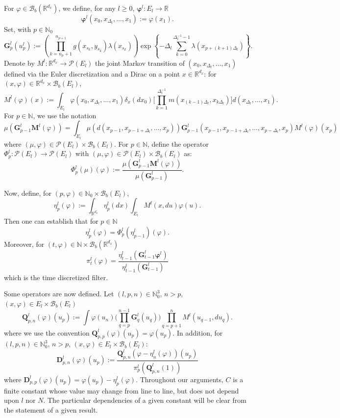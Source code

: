 \documentclass[english]{article}
\begin{document}
For $\varphi\in\mathcal{B}_b(\mathbb{R}^{d_x})$, we define, for any $l\geq 0$, $\pmb{\varphi}^l:E_l\rightarrow\mathbb{R}$
$$
\pmb{\varphi}^l(x_0,x_{\Delta_l},\dots,x_{1}) := \varphi(x_1).
$$
Set, with $p\in\mathbb{N}_0$
$$
\mathbf{G}_p^l(u_p^l) := \left(\prod_{k=n_{p}+1}^{n_{p+1} }g(x_{s_k},y_{s_k})\lambda(x_{s_k})\right)\exp\left\{-\Delta_l\sum_{k=0}^{\Delta_l^{-1}-1}\lambda(x_{p+(k+1)\Delta_l})\right\}.
$$
Denote by $M^l:\mathbb{R}^{d_x}\rightarrow\mathcal{P}(E_l)$ the joint Markov transition of $(x_0,x_{\Delta_l},\dots,x_{1})$ defined via the Euler discretization and a Dirac on a point $x\in\mathbb{R}^{d_x}$:  for $(x,\varphi)\in\mathbb{R}^{d_x}\times\mathcal{B}_b(E_l)$, 
$$
M^l(\varphi)(x) := \int_{E_l}\varphi(x_0,x_{\Delta_l},\dots,x_{1})\delta_x(dx_0)\Big[\prod_{k=1}^{\Delta_l^{-1}}m(x_{(k-1)\Delta_l},x_{k\Delta_l})\Big]d(x_{\Delta_l},\dots,x_{1}).
$$
For $p\in\mathbb{N}$, we use the notation 
$$
\mu(\mathbf{G}_{p-1}^l\mathbf{M}^l(\varphi))= \int_{E_l}\mu(d(x_{p-1},x_{p-1+\Delta_l},\dots,x_{p}))\mathbf{G}_{p-1}^l(x_{p-1},x_{p-1+\Delta_l},\dots,x_{p-\Delta_l}, x_p)M^l(\varphi)(x_p)
$$ 
where $(\mu,\varphi)\in\mathcal{P}(E_l)\times\mathcal{B}_b(E_l)$. 
For $p\in\mathbb{N}$, define the operator $\Phi_p^l:\mathcal{P}(E_l)\rightarrow\mathcal{P}(E_l)$ with $(\mu,\varphi)\in\mathcal{P}(E_l)\times\mathcal{B}_b(E_l)$ as:
$$
\Phi_p^l(\mu)(\varphi) :=  \frac{\mu(\mathbf{G}_{p-1}^l\mathbf{M}^l(\varphi))}{\mu(\mathbf{G}_{p-1}^l)}.
$$

Now, define, for $(p,\varphi)\in\mathbb{N}_0\times\mathcal{B}_b(E_l)$, 
$$
\eta_p^l(\varphi) := \int_{\mathbb{R}^{d_x}}\eta_{p}^l(dx) \int_{E_l} M^l(x,du)\varphi(u).
$$
Then one can establish that for $p\in\mathbb{N}$
$$
\eta_p^l(\varphi) = \Phi_p^l(\eta_{p-1}^l)(\varphi).
$$
Moreover, for $(t,\varphi)\in\mathbb{N}\times\mathcal{B}_b(\mathbb{R}^{d_x})$
$$
\pi_t^l(\varphi) = \frac{\eta_{t-1}^l(\mathbf{G}_{t-1}^l\pmb{\varphi}^l)}{\eta_{t-1}^l(\mathbf{G}_{t-1}^l)}
$$
which is the time discretized filter.

Some operators are now defined. Let $(l,p,n)\in\mathbb{N}_0^3$, $n>p$, $(x,\varphi)\in E_l\times\mathcal{B}_b(E_l)$
$$
\mathbf{Q}_{p,n}^l(\varphi)(u_p) := \int \varphi(u_n)\Big(\prod_{q=p}^{n-1} \mathbf{G}_q^l(u_q)\Big) \prod_{q=p+1}^{n}M^l(u_{q-1},du_q).
$$
where we use the convention $\mathbf{Q}_{p,p}^l(\varphi)(u_p)=\varphi(u_p)$. 
In addition, for $(l,p,n)\in\mathbb{N}_0^3$, $n>p$, $(x,\varphi)\in E_l\times\mathcal{B}_b(E_l)$:
$$
\mathbf{D}_{p,n}^l(\varphi)(u_p) := \frac{\mathbf{Q}_{p,n}^l(\varphi-\eta_n^l(\varphi))(u_p)}{\pi_p^l(\mathbf{Q}_{p,n}^l(1))}
$$
where $\mathbf{D}_{p,p}^l(\varphi)(u_p)=\varphi(u_p)-\eta_p^l(\varphi)$.
Throughout our arguments, $C$ is a finite constant whose value may change from line to line, but does not depend upon $l$ nor $N$. The particular dependencies of a given constant will be clear from the statement of a given result. 
\end{document}
